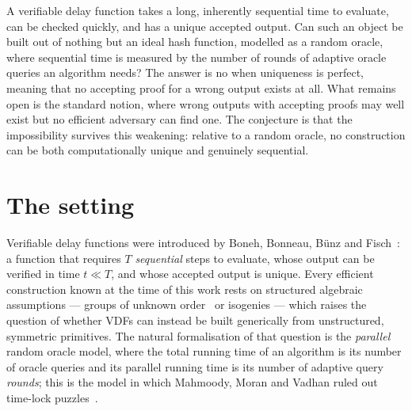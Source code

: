 \documentclass{aicr-conjecture}
\begin{document}

\vspace{0.4em}

\begin{informalconjecture}
A verifiable delay function takes a long, inherently sequential time to
evaluate, can be checked quickly, and has a unique accepted output. Can
such an object be built out of nothing but an ideal hash function,
modelled as a random oracle, where sequential time is measured by the
number of rounds of adaptive oracle queries an algorithm needs? The answer
is no when uniqueness is perfect, meaning that no accepting proof for a
wrong output exists at all. What remains open is the standard notion,
where wrong outputs with accepting proofs may well exist but no efficient
adversary can find one. The conjecture is that the impossibility survives
this weakening: relative to a random oracle, no construction can be both
computationally unique and genuinely sequential.
\end{informalconjecture}

\section{The setting}\label{sec:setting}

Verifiable delay functions were introduced by Boneh, Bonneau, B\"unz and
Fisch~\cite{BBBF18}: a function that requires $T$ \emph{sequential} steps
to evaluate, whose output can be verified in time $t \ll T$, and whose
accepted output is unique. Every efficient construction known at the time
of this work rests on structured algebraic assumptions --- groups of
unknown order~\cite{Wes19,Pie19} or isogenies --- which raises the
question of whether VDFs can instead be built generically from
unstructured, symmetric primitives. The natural formalisation of that
question is the \emph{parallel} random oracle model, where the total
running time of an algorithm is its number of oracle queries and its
parallel running time is its number of adaptive query \emph{rounds}; this
is the model in which Mahmoody, Moran and Vadhan ruled out time-lock
puzzles~\cite{MMV11}.
\end{document}
